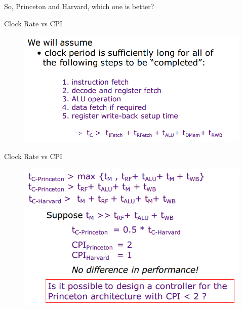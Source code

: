 \documentclass{myslide}
\begin{document}
\begin{frame}
\begin{center}
\large So, Princeton and Harvard, which one is better?
\end{center}
\end{frame}

\begin{frame}{Clock Rate vs CPI}
\begin{figure}
\centering
\includegraphics[width=0.8\linewidth]{fig/Lecture2/clock_1.PNG}
\end{figure}
\end{frame}

\begin{frame}{Clock Rate vs CPI}
\begin{figure}
\centering
\includegraphics[width=0.8\linewidth]{fig/Lecture2/clock_rate-vs-cpi.PNG}
\end{figure}
\end{frame}
\end{document}
